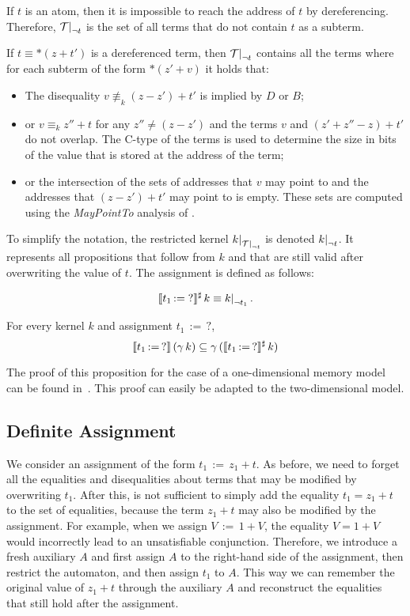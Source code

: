 If $t$ is an atom, then it is impossible to reach the address of $t$ by dereferencing.
Therefore, $\restr{\T}{\neg t}$ is the set of all terms that do not contain $t$ as a subterm.

If $t \equiv *(z + t')$ is a dereferenced term, then $\restr{\T}{\neg t}$ contains all the terms where for each subterm of the form $*(z' + v)$ it holds that:
\begin{itemize}
	\item\label{item:diseqs} The disequality $v \nequiv_k (z - z') + t'$ is implied by $D$ or $B$;
    \item\label{item:eqs} or $v \equiv_k z'' + t$ for any $z'' \neq (z - z')$ and the terms $v$ and $(z' + z'' - z) + t'$ do not overlap. The C-type of the terms is used to determine the size in bits of the value that is stored at the address of the term;
    \item or the intersection of the sets of addresses that $v$ may point to and the addresses that $(z - z') + t'$ may point to is empty.
    These sets are computed using the \emph{MayPointTo} analysis of \goblint.
\end{itemize}

To simplify the notation, the restricted kernel $\restr{k}{\restr{\T}{\neg t}}$ is denoted $\restr{k}{\neg t}$.
It represents all propositions that follow from $k$ and that are still valid after overwriting the value of $t$.
The assignment is defined as follows:

\[
	\sem{t_1\,{:=}\;?}^\sharp\,k \equiv \restr{k}{\neg t_1}.
\]

\begin{proposition}\label{p:ass-unknown}
	For every kernel $k$ and assignment $t_1\,{:=}\,?$,
	\[
		\llbracket t_1\,{:=}\,?\rrbracket\,(\gamma\,k) \subseteq \gamma\,(\llbracket t_1\,{:=}\,?\rrbracket^\sharp\,k)
	\]
\end{proposition}

The proof of this proposition for the case of a one-dimensional memory model can be found in~\cite{2pointer}.
This proof can easily be adapted to the two-dimensional model.

\subsection{Definite Assignment}

We consider an assignment of the form $t_1\,{:=}\,z_1+t$.
As before, we need to forget all the equalities and disequalities about terms that may be modified by overwriting $t_1$.
After this, is not sufficient to simply add the equality $t_1 = z_1+t$ to the set of equalities,
because the term $z_1 + t$ may also be modified by the assignment. For example, when we assign $V\,{:=}\,1+V$, the equality $V = 1 + V$ would incorrectly lead to an unsatisfiable conjunction.
Therefore, we introduce a fresh auxiliary $A$ and first assign $A$ to the right-hand side of the assignment, then restrict the automaton, and then assign $t_1$ to $A$.
This way we can remember the original value of $z_1 + t$ through the auxiliary $A$ and reconstruct the equalities that still hold after the assignment.

